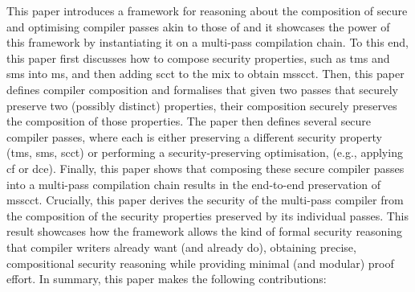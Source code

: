 \documentclass[dvipsnames]{llncs}
\begin{document}
This paper introduces a framework for reasoning about the composition of secure and optimising compiler passes akin to those of  and it showcases the power of this framework by instantiating it on a multi-pass compilation chain.
To this end, this paper first discusses how to compose security properties, such as \gls*{tms} and \gls*{sms} into \gls*{ms}, and then adding \gls*{scct} to the mix to obtain \gls*{msscct}.
Then, this paper defines compiler composition and formalises that given two passes that securely preserve two (possibly distinct) properties, their composition securely preserves the composition of those properties.
The paper then defines several secure compiler passes, where each is either preserving a different security property (\gls*{tms}, \gls*{sms}, \gls*{scct}) or performing a security-preserving optimisation, (e.g., applying \gls*{cf} or \gls*{dce}).
Finally, this paper shows that composing these secure compiler passes into a multi-pass compilation chain results in the end-to-end preservation of \gls*{msscct}.
Crucially, this paper derives the security of the multi-pass compiler from the composition of the security properties preserved by its individual passes.
This result showcases how the framework allows the kind of formal security reasoning that compiler writers already want (and already do), obtaining precise, compositional security reasoning while providing minimal (and modular) proof effort.
%
In summary, this paper makes the following contributions:
\end{document}
